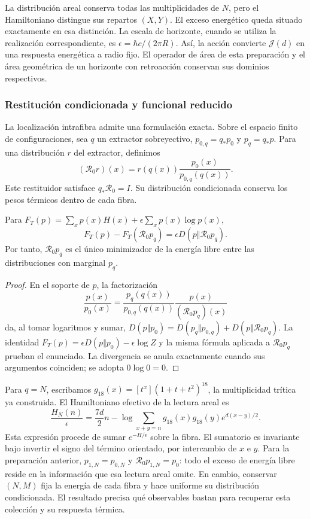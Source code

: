 La distribución areal conserva todas las multiplicidades de \(N\),
pero el Hamiltoniano distingue sus repartos \((X,Y)\). El exceso
energético queda situado exactamente en esa distinción. La escala de
horizonte, cuando se utiliza la realización correspondiente, es
\(\epsilon=\hbar c/(2\pi R)\). Así, la acción convierte
\(\mathcal J(d)\) en una respuesta energética a radio fijo. El
operador de área de esta preparación y el área geométrica de un horizonte
con retroacción conservan sus dominios respectivos.

\subsubsection{Restitución condicionada y funcional reducido}

La localización intrafibra admite una formulación exacta. Sobre el
espacio finito de configuraciones, sea \(q\) un extractor sobreyectivo,
\(p_{0,q}=q_*p_0\) y \(p_q=q_*p\). Para una distribución \(r\) del
extractor, definimos
\[
 (\mathcal R_0r)(x)
 =r(q(x))\frac{p_0(x)}{p_{0,q}(q(x))}.
\]
Este restituidor satisface \(q_*\mathcal R_0=I\). Su distribución
condicionada conserva los pesos térmicos dentro de cada fibra.

\begin{proposition}
\label{ins29:v:restitucion}
Para \(F_T(p)=\sum_xp(x)H(x)+\epsilon\sum_xp(x)\log p(x)\),
\[
 F_T(p)-F_T(\mathcal R_0p_q)
 =\epsilon D(p\Vert\mathcal R_0p_q).
\]
Por tanto, \(\mathcal R_0p_q\) es el único minimizador de la energía
libre entre las distribuciones con marginal \(p_q\).
\end{proposition}
\begin{proof}
En el soporte de \(p\), la factorización
\[
 \frac{p(x)}{p_0(x)}=
 \frac{p_q(q(x))}{p_{0,q}(q(x))}
 \frac{p(x)}{(\mathcal R_0p_q)(x)}
\]
da, al tomar logaritmos y sumar,
\(D(p\Vert p_0)=D(p_q\Vert p_{0,q})+
D(p\Vert\mathcal R_0p_q)\).
La identidad \(F_T(p)=\epsilon D(p\Vert p_0)-\epsilon\log Z\)
y la misma fórmula aplicada a \(\mathcal R_0p_q\) prueban el
enunciado. La divergencia se anula exactamente cuando sus argumentos
coinciden; se adopta \(0\log0=0\).
\end{proof}

Para \(q=N\), escribamos
\(g_{18}(x)=[t^x](1+t+t^2)^{18}\), la multiplicidad trítica ya
construida. El Hamiltoniano efectivo de la lectura areal es
\[
 \frac{H_N(n)}\epsilon=
 \frac{7d}{2}n-\log\!\sum_{x+y=n}
 g_{18}(x)g_{18}(y)e^{d(x-y)/2}.
\]
Esta expresión procede de sumar \(e^{-H/\epsilon}\) sobre la fibra.
El sumatorio es invariante bajo invertir el signo del término orientado,
por intercambio de \(x\) e \(y\). Para la preparación anterior,
\(p_{1,N}=p_{0,N}\) y \(\mathcal R_0p_{1,N}=p_0\): todo el exceso
de energía libre reside en la información que esa lectura areal omite.
En cambio, conservar \((N,M)\) fija la energía de cada fibra y hace
uniforme su distribución condicionada. El resultado precisa qué
observables bastan para recuperar esta colección y su respuesta térmica.
